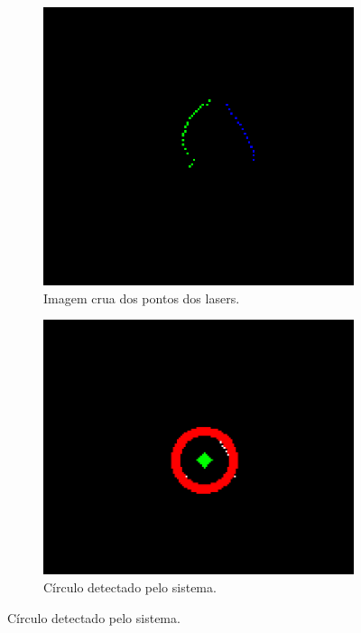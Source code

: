 \documentclass[acronym, symbols, table, deposito]{fei}
\begin{document}
				\begin{figure}[!h]
					\centering
					\caption{Duas etapas da arquitetura desenvolvida.}
					\begin{subfigure}[t]{0.38\textwidth}
						\centering
						\includegraphics[width=\textwidth]{raw_lidars_image.png}
						\caption{Imagem crua dos pontos dos lasers.} \label{fig:raw_image}
					\end{subfigure}%
					\hspace{1em}
					\begin{subfigure}[t]{0.415\textwidth}
						\centering
						\includegraphics[width=\textwidth]{robot_detected_image.png}
						\caption{Círculo detectado pelo sistema.} \label{fig:robot_detected}
					\end{subfigure}
					\label{fig:robot_detection}
				\end{figure}
			
\end{document}
